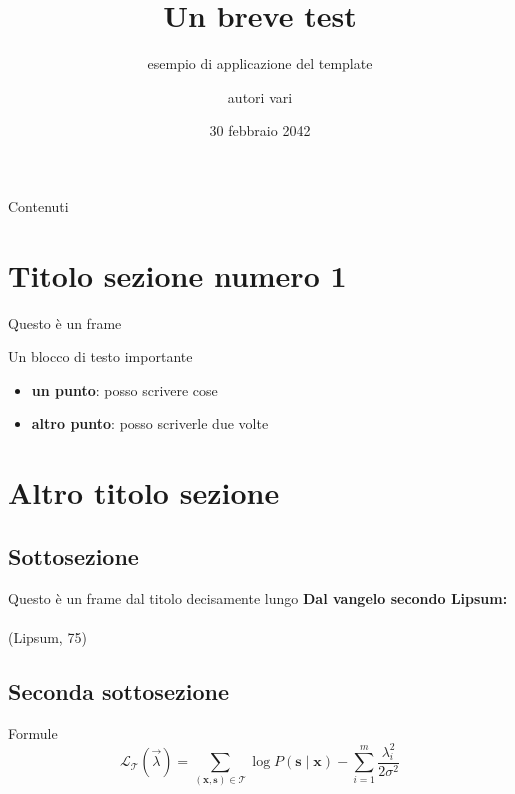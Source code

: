 \documentclass{beamer}
\title{Un breve test}
\subtitle{esempio di applicazione del template}
\author{autori vari}
\institute{Università di Trento}
\date{30 febbraio 2042}
\begin{document}

\begin{frame}
  \titlepage
\end{frame}

\begin{frame}{Contenuti}
  \tableofcontents
\end{frame}

\section{Titolo sezione numero 1}

\begin{frame}{Questo è un frame}
    \begin{block}{Un blocco di testo importante}
        \lipsum[66]
    \end{block}
    \pause
    \begin{itemize}
      \item \textbf{un punto}: posso scrivere cose
      \pause
      \item \textbf{altro punto}: posso scriverle due volte
    \end{itemize}
\end{frame}

\section{Altro titolo sezione}
\subsection{Sottosezione}
\begin{frame}{Questo è un frame dal titolo decisamente lungo}
    \textbf{Dal vangelo secondo Lipsum:} \\
    \pause
    \textit{\lipsum[75]} \\ 
    (Lipsum, 75)
\end{frame}

\subsection{Seconda sottosezione}

\begin{frame}{Formule}
    \[
    \mathcal L_{\mathcal T}(\vec{\lambda})
    = \sum_{(\mathbf{x},\mathbf{s})\in \mathcal T}
       \log P(\mathbf{s}\mid\mathbf{x}) - \sum_{i=1}^m
       \frac{\lambda_i^2}{2\sigma^2}
    \]
\end{frame}
\end{document}
